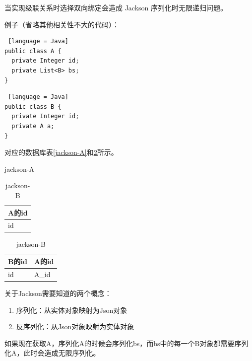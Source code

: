 当实现级联关系时选择双向绑定会造成 Jackson 序列化时无限递归问题。

例子（省略其他相关性不大的代码）：

\begin{lstlisting} [language = Java]
public class A {
  private Integer id;
  private List<B> bs;
}
\end{lstlisting}

\begin{lstlisting} [language = Java]
public class B {
  private Integer id;
  private A a;
}
\end{lstlisting}

对应的数据库表\ref{jackson-A}和\ref{jackson-B}所示。

\begin{table}[htbp]
  \begin{minipage}{0.45\linewidth}
    \centering
    \song\wuhao
    \caption{jackson-A}
    \label{jackson-A}
    \begin{tabular}{l}
      \hline
      A的id \\ \hline
      id    \\ \hline
    \end{tabular}
  \end{minipage}
  \begin{minipage}{0.45\linewidth}
    \centering
    \song\wuhao
    \caption{jackson-B}
    \label{jackson-B}
    \begin{tabular}{ll}
      \hline
      B的id & A的id \\ \hline
      id    & A\_id \\ \hline
    \end{tabular}
  \end{minipage}
\end{table}

关于Jackson需要知道的两个概念：
\begin{enumerate}
  \item 序列化：从实体对象映射为Json对象
  \item 反序列化：从Json对象映射为实体对象
\end{enumerate}

如果现在获取A，序列化A的时候会序列化bs，而bs中的每一个B对象都需要序列化A，此时会造成无限序列化。


